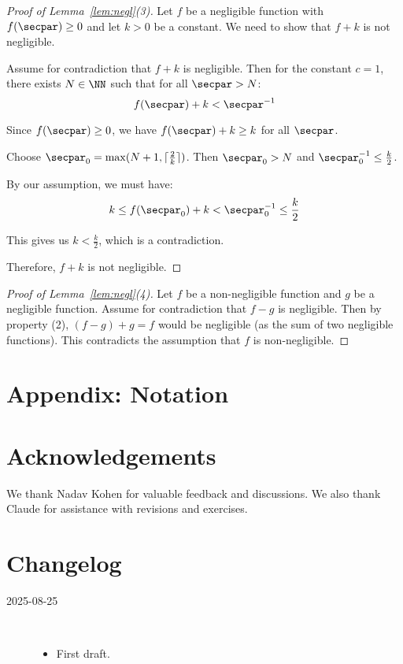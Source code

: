 \documentclass[
  a4paper,
  orivec,oribibl]{llncs}
\begin{document}
\begin{proof}[Proof of Lemma~\ref{lem:negl}(3)]
  Let $f$ be a negligible function with $f(\secpar) \ge 0$ and let $k > 0$ be a constant.
  We need to show that $f + k$ is not negligible.
  
  Assume for contradiction that $f + k$ is negligible. 
  Then for the constant $c = 1$, there exists $N \in \NN$ such that for all $\secpar > N$:
  \[
    f(\secpar) + k < \secpar^{-1}
  \]
  
  Since $f(\secpar) \ge 0$, we have $f(\secpar) + k \ge k$ for all $\secpar$.
  
  Choose $\secpar_0 = \max(N + 1, \lceil \frac{2}{k} \rceil)$. Then $\secpar_0 > N$ and $\secpar_0^{-1} \le \frac{k}{2}$.
  
  By our assumption, we must have:
  \[
    k \le f(\secpar_0) + k < \secpar_0^{-1} \le \frac{k}{2}
  \]
  
  This gives us $k < \frac{k}{2}$, which is a contradiction.
  
  Therefore, $f + k$ is not negligible.
\end{proof}

\begin{proof}[Proof of Lemma~\ref{lem:negl}(4)]
  Let $f$ be a non-negligible function and $g$ be a negligible function.
  Assume for contradiction that $f - g$ is negligible.
  Then by property (2), $(f - g) + g = f$ would be negligible (as the sum of two negligible functions).
  This contradicts the assumption that $f$ is non-negligible.
\end{proof}

\section{Appendix: Notation}\label{sec:appendix-notation}

\section*{Acknowledgements}
We thank Nadav Kohen for valuable feedback and discussions.
We also thank Claude for assistance with revisions and exercises.

\iffull

  \section*{Changelog}\label{sec:changelog}
  \begin{description}
    \item[2025-08-25]\
          \begin{itemize}
            \item First draft.
          \end{itemize}
  \end{description}
  \vspace{-2em}
\fi

{}
\printbibliography\label{sec:bib}
\end{document}
